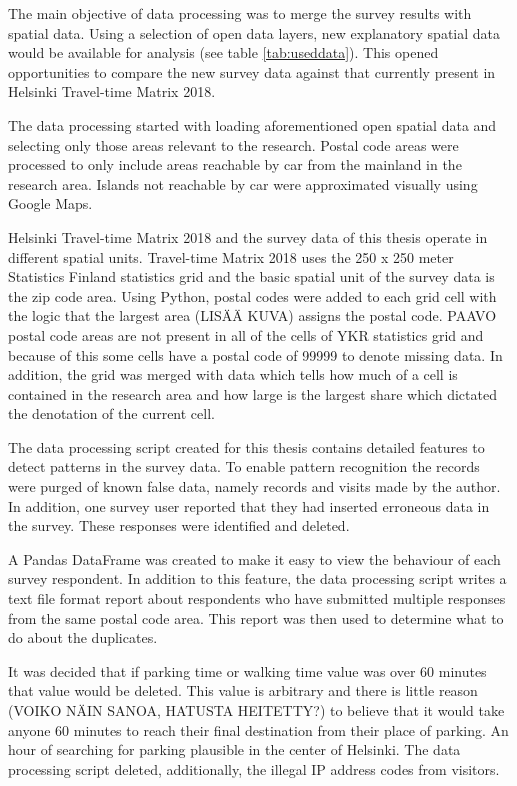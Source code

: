 The main objective of data processing was to merge the survey results with spatial data. Using a selection of open data layers, new explanatory spatial data would be available for analysis (see table \ref{tab:useddata}). This opened opportunities to compare the new survey data against that currently present in Helsinki Travel-time Matrix 2018.

The data processing started with loading aforementioned open spatial data and selecting only those areas relevant to the research. Postal code areas were processed to only include areas reachable by car from the mainland in the research area. Islands not reachable by car were approximated visually using Google Maps.

Helsinki Travel-time Matrix 2018 and the survey data of this thesis operate in different spatial units. Travel-time Matrix 2018 uses the 250 x 250 meter Statistics Finland statistics grid and the basic spatial unit of the survey data is the zip code area. Using Python, postal codes were added to each grid cell with the logic that the largest area (LISÄÄ KUVA) assigns the postal code. PAAVO postal code areas are not present in all of the cells of YKR statistics grid and because of this some cells have a postal code of 99999 to denote missing data. In addition, the grid was merged with data which tells how much of a cell is contained in the research area and how large is the largest share which dictated the denotation of the current cell.

The data processing script created for this thesis contains detailed features to detect patterns in the survey data. To enable pattern recognition the records were purged of known false data, namely records and visits made by the author. In addition, one survey user reported that they had inserted erroneous data in the survey. These responses were identified and deleted.

A Pandas DataFrame was created to make it easy to view the behaviour of each survey respondent. In addition to this feature, the data processing script writes a text file format report about respondents who have submitted multiple responses from the same postal code area. This report was then used to determine what to do about the duplicates.

It was decided that if parking time or walking time value was over 60 minutes that value would be deleted. This value is arbitrary and there is little reason (VOIKO NÄIN SANOA, HATUSTA HEITETTY?) to believe that it would take anyone 60 minutes to reach their final destination from their place of parking. An hour of searching for parking plausible in the center of Helsinki. The data processing script deleted, additionally, the illegal IP address codes from visitors.

